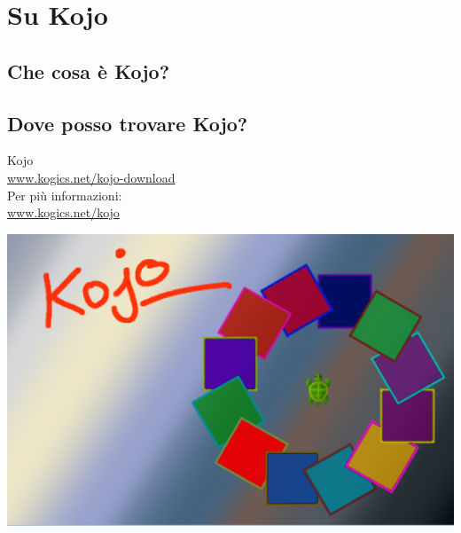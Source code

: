 \chapter{Su Kojo}
\begin{multicols}{2}
\section*{\color{black}Che cosa è Kojo?}
\section*{\color{black}Dove posso trovare Kojo?}
Kojo %
\\

\href{http://www.kogics.net/kojo-download}{www.kogics.net/kojo-download}
\\

Per più informazioni: 
\\

\href{http://www.kogics.net/kojo}{www.kogics.net/kojo}

\columnbreak

\begin{center}
\includegraphics[width=14.0cm]{../img/kojo.png}
\end{center}

\end{multicols}

